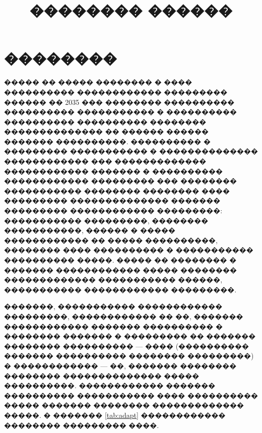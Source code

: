 \documentclass[11pt]{ubs}
\title{�������� ������}%
\begin{document}
\maketitle

\section{��������}
����� �� ����� �������� � ���� ���������� ������������ ��������� ������ �� 2035 ��� \cite{transp_strat} �������� ���������� ���������� ����������� � ���������� ���������� ���������� �������� �������������� �� ������ ������ ������� ����������.
���������� � ��������� ����������� � �������������� ������������ ��� ������������� ������������ ������� � ����������
������������ ��������� ��� �������� ����������� �������� �������� ���� ��������� �������������� ������� ��������� ������������ ���������: ����������� ���������, �������� �����������, ������ � ����� ������������ �� ����� ����������, �������� ���� ���������� � ����������� ���������� �����. ����� �� �������� � ������� ������������ ����� �������� ������������� ����������� ������, ����������� ������������ ���������.



�������, ����������� ������������ ���������, ������������ �� ��, ������� ������������ ������� ���������� � �������� ������� � ��������� �� ������� �������� ���������� --- ���� (���������� ������� ���������� �������� ���������) � ������������ --- ��, ������� �������� �������� �������������� ����� ����������.
������������ ������� ����������  ����������� ���� ���������� ����� ������� �������� ������������� �����.
� ������� \ref{tab:adapt} ������������ �������� ��������� ����.
\end{document}
